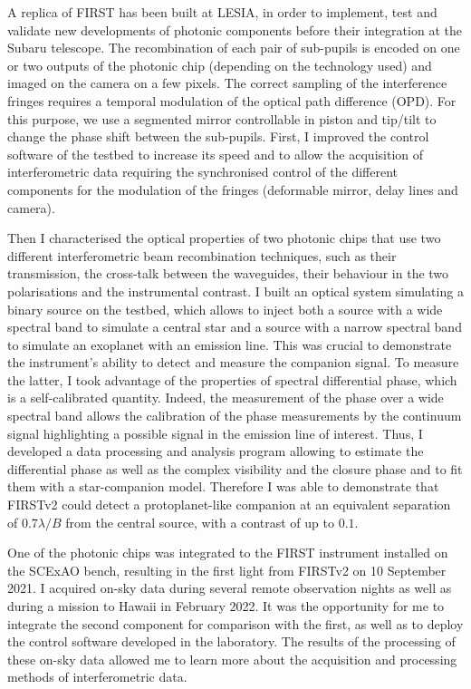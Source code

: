A replica of FIRST has been built at LESIA, in order to implement, test and validate new developments of photonic components before their integration at the Subaru telescope. The recombination of each pair of sub-pupils is encoded on one or two outputs of the photonic chip (depending on the technology used) and imaged on the camera on a few pixels. The correct sampling of the interference fringes requires a temporal modulation of the optical path difference (OPD). For this purpose, we use a segmented mirror controllable in piston and tip/tilt to change the phase shift between the sub-pupils. First, I improved the control software of the testbed to increase its speed and to allow the acquisition of interferometric data requiring the synchronised control of the different components for the modulation of the fringes (deformable mirror, delay lines and camera).

Then I characterised the optical properties of two photonic chips that use two different interferometric beam recombination techniques, such as their transmission, the cross-talk between the waveguides, their behaviour in the two polarisations and the instrumental contrast. I built an optical system simulating a binary source on the testbed, which allows to inject both a source with a wide spectral band to simulate a central star and a source with a narrow spectral band to simulate an exoplanet with an emission line. This was crucial to demonstrate the instrument's ability to detect and measure the companion signal. To measure the latter, I took advantage of the properties of spectral differential phase, which is a self-calibrated quantity. Indeed, the measurement of the phase over a wide spectral band allows the calibration of the phase measurements by the continuum signal highlighting a possible signal in the emission line of interest. Thus, I developed a data processing and analysis program allowing to estimate the differential phase as well as the complex visibility and the closure phase and to fit them with a star-companion model. Therefore I was able to demonstrate that FIRSTv2 could detect a protoplanet-like companion at an equivalent separation of $0.7 \lambda / B$ from the central source, with a contrast of up to $0.1$.

One of the photonic chips was integrated to the FIRST instrument installed on the SCExAO bench, resulting in the first light from FIRSTv2 on 10 September 2021. I acquired on-sky data during several remote observation nights as well as during a mission to Hawaii in February 2022. It was the opportunity for me to integrate the second component for comparison with the first, as well as to deploy the control software developed in the laboratory. The results of the processing of these on-sky data allowed me to learn more about the acquisition and processing methods of interferometric data.

